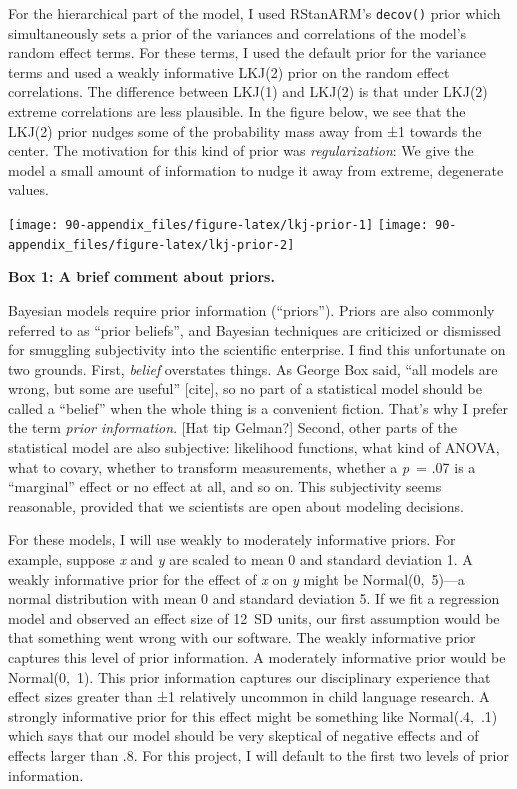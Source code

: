 \documentclass [11pt, proquest] {uwthesis}[2015/03/03]
\begin{document}
For the hierarchical part of the model, I used RStanARM's
\texttt{decov()} prior which simultaneously sets a prior of the
variances and correlations of the model's random effect terms. For these
terms, I used the default prior for the variance terms and used a weakly
informative LKJ(2) prior on the random effect correlations. The
difference between LKJ(1) and LKJ(2) is that under LKJ(2) extreme
correlations are less plausible. In the figure below, we see that the
LKJ(2) prior nudges some of the probability mass away from ±1 towards
the center. The motivation for this kind of prior was
\emph{regularization}: We give the model a small amount of information
to nudge it away from extreme, degenerate values.

\texttt{[image: 90-appendix\_files/figure-latex/lkj-prior-1]}
\texttt{[image: 90-appendix\_files/figure-latex/lkj-prior-2]}

\textbf{Box 1: A brief comment about priors.}

Bayesian models require prior information (``priors''). Priors are also
commonly referred to as ``prior beliefs'', and Bayesian techniques are
criticized or dismissed for smuggling subjectivity into the scientific
enterprise. I find this unfortunate on two grounds. First, \emph{belief}
overstates things. As George Box said, ``all models are wrong, but some
are useful'' {[}cite{]}, so no part of a statistical model should be
called a ``belief'' when the whole thing is a convenient fiction. That's
why I prefer the term \emph{prior information}. {[}Hat tip Gelman?{]}
Second, other parts of the statistical model are also subjective:
likelihood functions, what kind of ANOVA, what to covary, whether to
transform measurements, whether a \emph{p}~= .07 is a ``marginal''
effect or no effect at all, and so on. This subjectivity seems
reasonable, provided that we scientists are open about modeling
decisions.

For these models, I will use weakly to moderately informative priors.
For example, suppose \emph{x} and \emph{y} are scaled to mean 0 and
standard deviation 1. A weakly informative prior for the effect of
\emph{x} on \emph{y} might be Normal(0,~5)---a normal distribution with
mean 0 and standard deviation 5. If we fit a regression model and
observed an effect size of 12~SD units, our first assumption would be
that something went wrong with our software. The weakly informative
prior captures this level of prior information. A moderately informative
prior would be Normal(0,~1). This prior information captures our
disciplinary experience that effect sizes greater than ±1 relatively
uncommon in child language research. A strongly informative prior for
this effect might be something like Normal(.4,~.1) which says that our
model should be very skeptical of negative effects and of effects larger
than .8. For this project, I will default to the first two levels of
prior information.
\end{document}
